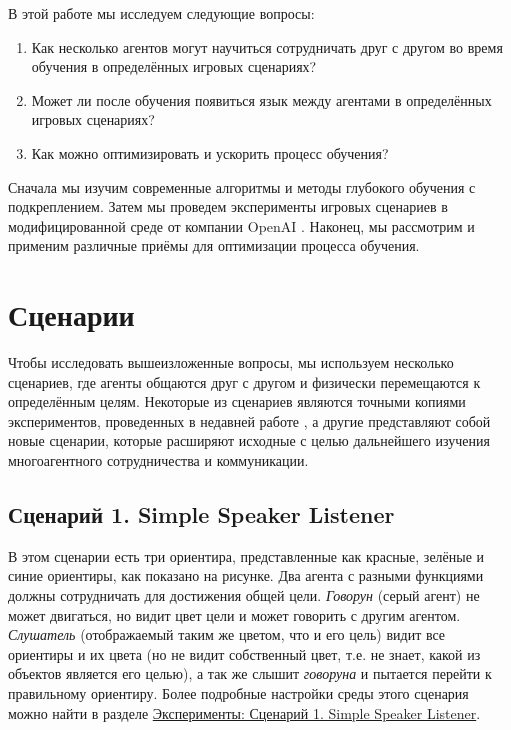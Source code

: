 В этой работе мы исследуем следующие вопросы:
\begin{enumerate}[1.]
	\item Как несколько агентов могут научиться сотрудничать друг с другом во время обучения в определённых игровых сценариях?
	\item Может ли после обучения появиться язык между агентами в определённых игровых сценариях?
	\item Как можно оптимизировать и ускорить процесс обучения?
\end{enumerate}
Сначала мы изучим современные алгоритмы и методы глубокого обучения с подкреплением. Затем мы проведем эксперименты игровых сценариев в модифицированной среде от компании OpenAI \cite{OpenAI-Gym}. Наконец, мы рассмотрим и применим различные приёмы для оптимизации процесса обучения.

\section{Сценарии} \label{intro:sec2}

Чтобы исследовать вышеизложенные вопросы, мы используем несколько сценариев, где агенты общаются друг с другом и физически перемещаются к определённым целям. Некоторые из сценариев являются точными копиями экспериментов, проведенных в недавней работе \cite{lowe2017multiagent}, а другие представляют собой новые сценарии, которые расширяют исходные с целью дальнейшего изучения многоагентного сотрудничества и коммуникации.

\subsection{Сценарий 1. Simple Speaker Listener} \label{intro:ssl}

В этом сценарии есть три ориентира, представленные как красные, зелёные и синие ориентиры, как показано на рисунке. Два агента с разными функциями должны сотрудничать для достижения общей цели. \textit{Говорун} (серый агент) не может двигаться, но видит цвет цели и может говорить с другим агентом. \textit{Слушатель} (отображаемый таким же цветом, что и его цель) видит все ориентиры и их цвета (но не видит собственный цвет, т.е. не знает, какой из объектов является его целью), а так же слышит \textit{говоруна} и пытается перейти к правильному ориентиру. Более подробные настройки среды этого сценария можно найти в разделе \hyperref[exp-ssl]{Эксперименты: Сценарий 1. Simple Speaker Listener}.

